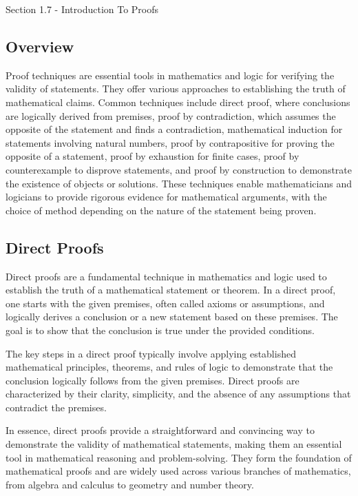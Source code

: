 \begin{notes}{Section 1.7 - Introduction To Proofs}
    \subsection*{Overview}

    Proof techniques are essential tools in mathematics and logic for verifying the validity of statements. They offer various approaches to establishing the truth of mathematical claims. Common techniques 
    include direct proof, where conclusions are logically derived from premises, proof by contradiction, which assumes the opposite of the statement and finds a contradiction, mathematical induction for 
    statements involving natural numbers, proof by contrapositive for proving the opposite of a statement, proof by exhaustion for finite cases, proof by counterexample to disprove statements, and proof by 
    construction to demonstrate the existence of objects or solutions. These techniques enable mathematicians and logicians to provide rigorous evidence for mathematical arguments, with the choice of method 
    depending on the nature of the statement being proven. \vspace*{1em}

    \subsection*{Direct Proofs}

    Direct proofs are a fundamental technique in mathematics and logic used to establish the truth of a mathematical statement or theorem. In a direct proof, one starts with the given premises, often called 
    axioms or assumptions, and logically derives a conclusion or a new statement based on these premises. The goal is to show that the conclusion is true under the provided conditions.

    The key steps in a direct proof typically involve applying established mathematical principles, theorems, and rules of logic to demonstrate that the conclusion logically follows from the given premises. 
    Direct proofs are characterized by their clarity, simplicity, and the absence of any assumptions that contradict the premises.

    In essence, direct proofs provide a straightforward and convincing way to demonstrate the validity of mathematical statements, making them an essential tool in mathematical reasoning and problem-solving. 
    They form the foundation of mathematical proofs and are widely used across various branches of mathematics, from algebra and calculus to geometry and number theory. \vspace*{1em}


\end{notes}
